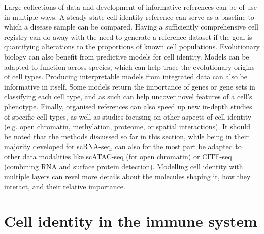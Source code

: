 Large collections of data and development of informative references can be of use in multiple ways. A steady-state cell identity reference can serve as a baseline to which a disease sample can be compared. Having a sufficiently comprehensive cell registry can do away with the need to generate a reference dataset if the goal is quantifying alterations to the proportions of known cell populations. Evolutionary biology can also benefit from predictive models for cell identity. Models can be adapted to function across species, which can help trace the evolutionary origins of cell types. Producing interpretable models from integrated data can also be informative in itself. Some models return the importance of genes or gene sets in classifying each cell type, and as such can help uncover novel features of a cell's phenotype. Finally, organised references can also speed up new in-depth studies of specific cell types, as well as studies focusing on other aspects of cell identity (e.g. open chromatin, methylation, proteome, or spatial interactions). It should be noted that the methods discussed so far in this section, while being in their majority developed for scRNA-seq, can also for the most part be adapted to other data modalities like scATAC-seq (for open chromatin) or CITE-seq (combining RNA and surface protein detection). Modelling cell identity with multiple layers can revel more details about the molecules shaping it, how they interact, and their relative importance.



\section{Cell identity in the immune system}  %
\label{section1.4}

